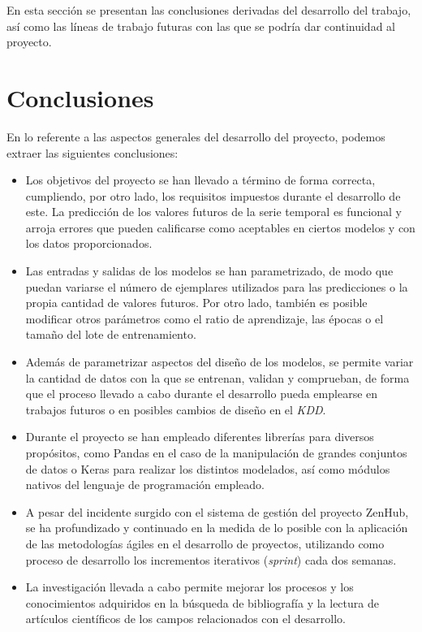 En esta sección se presentan las conclusiones derivadas del desarrollo del trabajo, así como las
líneas de trabajo futuras con las que se podría dar continuidad al proyecto.

\section{Conclusiones}
En lo referente a las aspectos generales del desarrollo del proyecto, podemos extraer las siguientes
conclusiones:
\begin{itemize}
    \item Los objetivos del proyecto se han llevado a término de forma correcta, cumpliendo,
        por otro lado, los requisitos impuestos durante el desarrollo de este. La predicción 
        de los valores futuros de la serie temporal es funcional y arroja errores que pueden
        calificarse como aceptables en ciertos modelos y con los datos proporcionados.
    \item Las entradas y salidas de los modelos se han parametrizado, de modo que puedan variarse
        el número de ejemplares utilizados para las predicciones o la propia cantidad de valores
        futuros. Por otro lado, también es posible modificar otros parámetros como el ratio de 
        aprendizaje, las épocas o el tamaño del lote de entrenamiento.
    \item Además de parametrizar aspectos del diseño de los modelos, se permite variar la cantidad
        de datos con la que se entrenan, validan y comprueban, de forma que el proceso llevado a cabo
        durante el desarrollo pueda emplearse en trabajos futuros o en posibles cambios de diseño
        en el \textit{KDD}.
    \item Durante el proyecto se han empleado diferentes librerías para diversos propósitos, como
        Pandas en el caso de la manipulación de grandes conjuntos de datos o Keras para realizar
        los distintos modelados, así como módulos nativos del lenguaje de programación empleado. 
    \item A pesar del incidente surgido con el sistema de gestión del proyecto ZenHub, se ha 
        profundizado y continuado en la medida de lo posible con la aplicación
        de las metodologías ágiles en el desarrollo de proyectos, utilizando como proceso de 
        desarrollo los incrementos iterativos (\textit{sprint}) cada dos semanas.
    \item La investigación llevada a cabo permite mejorar los procesos y los conocimientos adquiridos
        en la búsqueda de bibliografía y la lectura de artículos científicos de los campos relacionados
        con el desarrollo.
\end{itemize}

